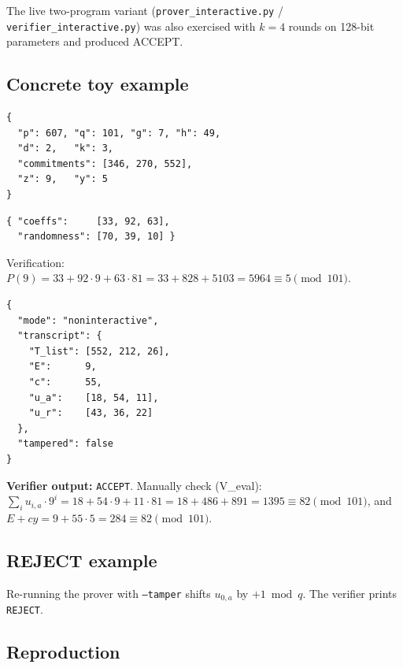 \documentclass[11pt,a4paper]{article}
\begin{document}
The live two-program variant (\texttt{prover\_interactive.py} /
\texttt{verifier\_interactive.py}) was also exercised with $k=4$ rounds
on 128-bit parameters and produced ACCEPT.

\subsection{Concrete toy example}

\begin{lstlisting}[style=jsonstyle, caption={\texttt{public.json} (toy)}]
{
  "p": 607, "q": 101, "g": 7, "h": 49,
  "d": 2,   "k": 3,
  "commitments": [346, 270, 552],
  "z": 9,   "y": 5
}
\end{lstlisting}

\begin{lstlisting}[style=jsonstyle, caption={\texttt{private.json} (toy)}]
{ "coeffs":     [33, 92, 63],
  "randomness": [70, 39, 10] }
\end{lstlisting}

Verification: $P(9) = 33 + 92\cdot 9 + 63\cdot 81 = 33 + 828 + 5103 = 5964
\equiv 5 \pmod{101}$. \checkmark

\begin{lstlisting}[style=jsonstyle, caption={\texttt{proof.json}
(non-interactive, after running \texttt{Problem4.py prover --mode noninteractive})}]
{
  "mode": "noninteractive",
  "transcript": {
    "T_list": [552, 212, 26],
    "E":      9,
    "c":      55,
    "u_a":    [18, 54, 11],
    "u_r":    [43, 36, 22]
  },
  "tampered": false
}
\end{lstlisting}

\textbf{Verifier output:} \texttt{ACCEPT}. Manually check (V\_eval):
$\sum_i u_{i,a}\cdot 9^{i} = 18 + 54\cdot 9 + 11\cdot 81
 = 18 + 486 + 891 = 1395 \equiv 82 \pmod{101}$, and
$E + cy = 9 + 55\cdot 5 = 284 \equiv 82 \pmod{101}$. \checkmark

\subsection{REJECT example}

Re-running the prover with \texttt{--tamper} shifts $u_{0,a}$ by $+1
\bmod q$. The verifier prints \texttt{REJECT}.

\subsection{Reproduction}
\end{document}
